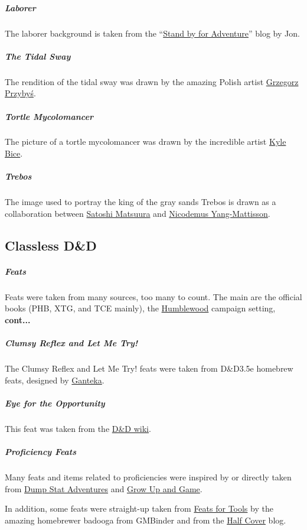     \subparagraph{Laborer} The laborer background is taken from the ``\href{https://standbyforadventure.blogspot.com/2014/08/d-background-laborer.html}{Stand by for Adventure}'' blog by Jon.

    \subparagraph{The Tidal Sway} The rendition of the tidal sway was drawn by the amazing Polish artist \href{https://grzegorzprzybys.artstation.com/}{Grzegorz Przybyś}.

    \subparagraph{Tortle Mycolomancer} The picture of a tortle mycolomancer was drawn by the incredible artist \href{https://twitter.com/KyleBice}{Kyle Bice}.

    \subparagraph{Trebos} The image used to portray the king of the gray sands Trebos is drawn as a collaboration between \href{https://www.artstation.com/hiziripro}{Satoshi Matsuura} and \href{https://www.artstation.com/nicodemus}{Nicodemus Yang-Mattisson}.

\subsection*{Classless D\&D}
    \subparagraph{Feats} Feats were taken from many sources, too many to count.
    The main are the official books (PHB, XTG, and TCE mainly), the \href{https://thedeckofmany.com/collections/humblewood}{Humblewood} campaign setting, \textbf{cont...}

    \subparagraph{Clumsy Reflex and Let Me Try!} The Clumsy Reflex and Let Me Try! feats were taken from D\&D3.5e homebrew feats, designed by \href{https://www.dandwiki.com/wiki/User:Ganteka}{Ganteka}.

    \subparagraph{Eye for the Opportunity} This feat was taken from the \href{https://www.dandwiki.com/wiki/Eye_for_the_opportunity_(5e_Feat)}{D\&D wiki}.

    \subparagraph{Proficiency Feats} Many feats and items related to proficiencies were inspired by or directly taken from \href{https://dumpstatadventures.com/the-gm-is-always-right/making-tools-useful-in-5e-glassblowers-tools#:~:text=Someone%20proficient%20with%20glassblower's%20tools,of%20heat%20to%20work%20glass.}{Dump Stat Adventures} and \href{https://growupandgame.com/dungeons-and-dragons/questionable-arcana/dnd-5e-crafting-glassblowers-tools/}{Grow Up and Game}.

    In addition, some feats were straight-up taken from \href{https://www.gmbinder.com/share/-MAcPWstQ1_hNxmnlFdR}{Feats for Tools} by the amazing homebrewer badooga from GMBinder and from the \href{half-cover.com}{Half Cover} blog.

